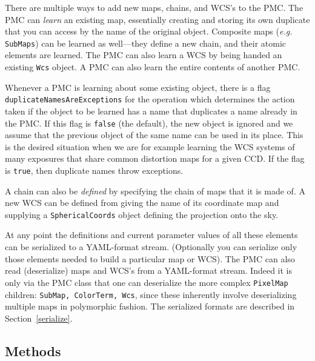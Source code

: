 \documentclass[11pt,preprint,flushrt]{aastex}
\begin{document}
There are multiple ways to add new maps, chains, and WCS's to the PMC.  
The PMC can {\em learn} an existing map, essentially creating and storing its own duplicate that you can access by the name of the original object.  Composite maps ({\it e.g.\/} {\tt SubMaps}) can be learned as well---they define a new chain, and their atomic elements are learned.  The PMC can also learn a WCS by being handed an existing {\tt Wcs} object.  A PMC can also learn the entire contents of another PMC.

Whenever a PMC is learning about some existing object, there is a flag {\tt duplicateNamesAreExceptions} for the operation which determines the action taken if the object to be learned has a name that duplicates a name already in the PMC.
If this flag is {\tt false} (the default), the new object is ignored and we assume that the previous object of the same name can be used in its place.  This is the desired situation when we are for example learning the WCS systems of many exposures that share common distortion maps for a given CCD.  If the flag is {\tt true}, then duplicate names throw exceptions.

A chain can also be {\em defined} by specifying the chain of maps that it is made of.  A new WCS can be defined from giving the name of its coordinate map and supplying a {\tt SphericalCoords} object defining the projection onto the sky.

At any point the definitions and current parameter values of all these elements can be serialized to a YAML-format stream.  (Optionally you can serialize only those elements needed to build a particular map or WCS).  The PMC can also read (deserialize) maps and WCS's from a YAML-format stream.  Indeed it is only via the PMC class that one can deserialize the more complex \texttt{PixelMap} children: \texttt{SubMap, ColorTerm, Wcs}, since these inherently involve deserializing multiple maps in polymorphic fashion.  The serialized formats are described in Section~\ref{serialize}.


\subsection{Methods}
\end{document}
